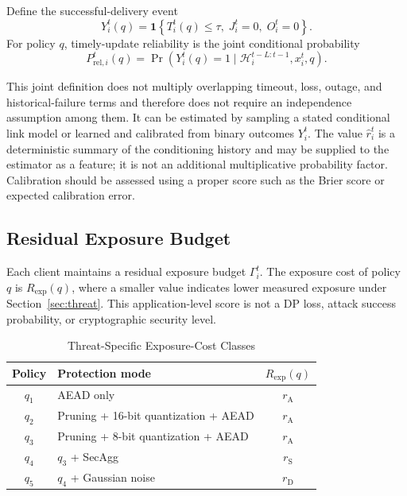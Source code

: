 \documentclass[preprint,12pt]{elsarticle}
\begin{document}
Define the successful-delivery event
\begin{equation}
	Y_i^t(q)=\mathbf{1}\!\left\{T_i^t(q)\leq\tau,\;J_i^t=0,\;O_i^t=0\right\}.
	\label{eq:success_event}
\end{equation}
For policy $q$, timely-update reliability is the joint conditional probability
\begin{equation}
	P_{\mathrm{rel},i}^{t}(q)
	=
	\Pr\!\left(Y_i^t(q)=1\mid \mathcal{H}_i^{t-L:t-1},x_i^t,q\right).
	\label{eq:reliability_score}
\end{equation}

This joint definition does not multiply overlapping timeout, loss, outage, and historical-failure terms and therefore does not require an independence assumption among them. It can be estimated by sampling a stated conditional link model or learned and calibrated from binary outcomes $Y_i^t$. The value $\hat r_i^t$ is a deterministic summary of the conditioning history and may be supplied to the estimator as a feature; it is not an additional multiplicative probability factor. Calibration should be assessed using a proper score such as the Brier score or expected calibration error.

\subsection{Residual Exposure Budget}
\label{sec:exposure_budget}

Each client maintains a residual exposure budget $\Gamma_i^t$. The exposure cost of policy $q$ is $R_{\mathrm{exp}}(q)$, where a smaller value indicates lower measured exposure under Section~\ref{sec:threat}. This application-level score is not a DP loss, attack success probability, or cryptographic security level.

\begin{table}[t]
	\centering
	\caption{Threat-Specific Exposure-Cost Classes}
	\label{tab:risk_cost}
	\scriptsize
	\setlength{\tabcolsep}{3pt}
	\renewcommand{\arraystretch}{1.12}
	\begin{tabular}{c >{\raggedright\arraybackslash}p{} c}
		\hline
		Policy & Protection mode & $R_{\mathrm{exp}}(q)$ \\
		\hline
		$q_1$ & AEAD only & $r_{\mathrm{A}}$ \\
		$q_2$ & Pruning + 16-bit quantization + AEAD & $r_{\mathrm{A}}$ \\
		$q_3$ & Pruning + 8-bit quantization + AEAD & $r_{\mathrm{A}}$ \\
		$q_4$ & $q_3$ + SecAgg & $r_{\mathrm{S}}$ \\
		$q_5$ & $q_4$ + Gaussian noise & $r_{\mathrm{D}}$ \\
		\hline
	\end{tabular}
\end{table}
\end{document}
